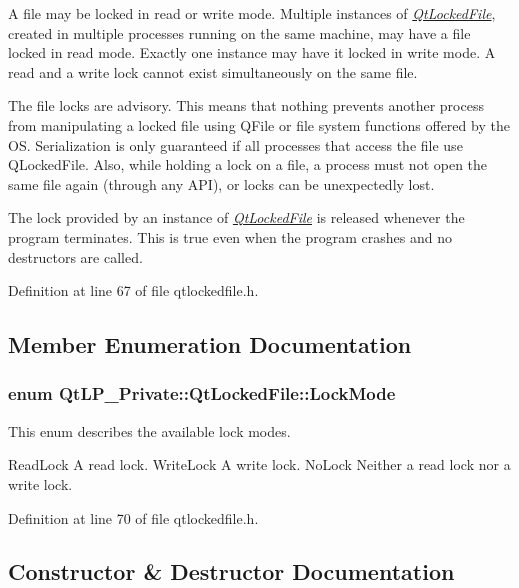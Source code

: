 A file may be locked in read or write mode. Multiple instances of {\itshape \hyperlink{class_qt_l_p___private_1_1_qt_locked_file}{Qt\+Locked\+File}}, created in multiple processes running on the same machine, may have a file locked in read mode. Exactly one instance may have it locked in write mode. A read and a write lock cannot exist simultaneously on the same file.

The file locks are advisory. This means that nothing prevents another process from manipulating a locked file using Q\+File or file system functions offered by the OS. Serialization is only guaranteed if all processes that access the file use Q\+Locked\+File. Also, while holding a lock on a file, a process must not open the same file again (through any A\+PI), or locks can be unexpectedly lost.

The lock provided by an instance of {\itshape \hyperlink{class_qt_l_p___private_1_1_qt_locked_file}{Qt\+Locked\+File}} is released whenever the program terminates. This is true even when the program crashes and no destructors are called. 

Definition at line 67 of file qtlockedfile.\+h.



\subsection{Member Enumeration Documentation}
\subsubsection[{\texorpdfstring{Lock\+Mode}{LockMode}}]{\setlength{\rightskip}{0pt plus 5cm}enum {\bf Qt\+L\+P\+\_\+\+Private\+::\+Qt\+Locked\+File\+::\+Lock\+Mode}}\hypertarget{class_qt_l_p___private_1_1_qt_locked_file_ab9a54228983e33cf1fb8dace52141f26}{}\label{class_qt_l_p___private_1_1_qt_locked_file_ab9a54228983e33cf1fb8dace52141f26}
This enum describes the available lock modes.

Read\+Lock A read lock.  Write\+Lock A write lock.  No\+Lock Neither a read lock nor a write lock. 

Definition at line 70 of file qtlockedfile.\+h.



\subsection{Constructor \& Destructor Documentation}
